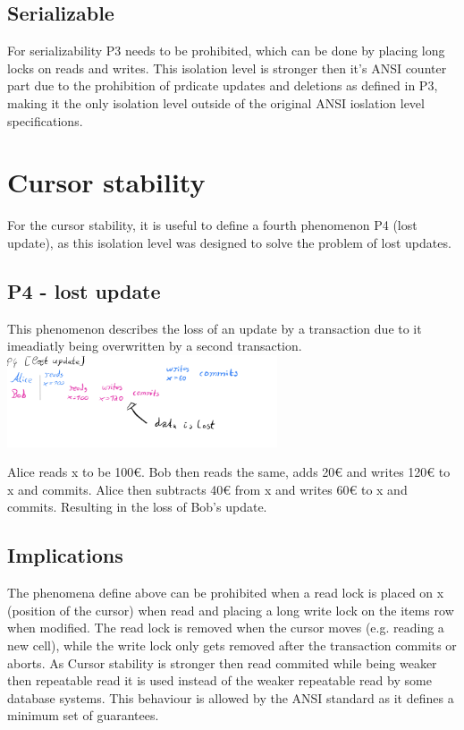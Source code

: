 \documentclass[sigconf, review=true]{acmart}
\begin{document}
\subsection{Serializable}
For serializability P3 needs to be prohibited, which can be done by placing long locks
on reads and writes. This isolation level is stronger then it's ANSI counter part due to the
prohibition of prdicate updates and deletions as defined in P3, making it the only isolation level
outside of the original ANSI ioslation level specifications.

\section{Cursor stability}
For the cursor stability, it is useful to define a fourth phenomenon P4 (lost update), as this isolation level
was designed to solve the problem of lost updates.
\subsection{ P4 - lost update}
This phenomenon describes the loss of an update by a transaction due to it imeadiatly being overwritten
by a second transaction.
\includegraphics[width=8cm]{P4}
\begin{example}
    Alice reads x to be 100€. Bob then reads the same, adds 20€ and writes 120€ to x and commits.
    Alice then subtracts 40€ from x and writes 60€ to x and commits. Resulting in the loss of Bob's update.
    \subsection{Implications}
    The phenomena define above can be prohibited when a read lock is placed on x (position of the cursor) when
    read and placing a long write lock on the items row when modified.
    The read lock is removed when the cursor moves (e.g. reading a new cell),
    while the write lock only gets removed after the transaction commits or aborts.
    As Cursor stability is stronger then read commited while being weaker then repeatable read it
    is used instead of the weaker repeatable read by some database systems. This behaviour is allowed by the ANSI standard
    as it defines a minimum set of guarantees.
\end{example}
\end{document}
